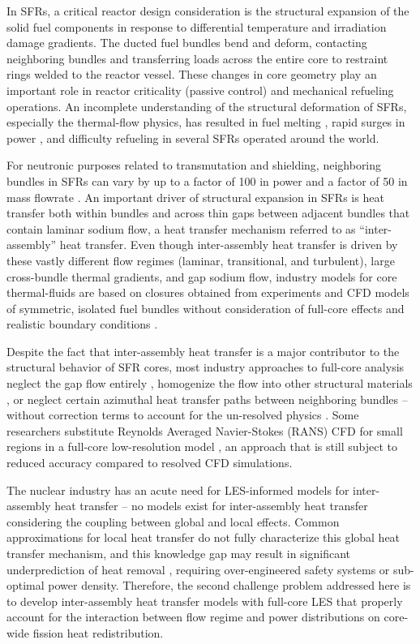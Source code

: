In SFRs, a critical reactor design consideration is the structural expansion of
the solid fuel components in response to differential temperature and
irradiation damage gradients. The ducted fuel bundles bend and deform,
contacting neighboring bundles and transferring loads across the entire core to
restraint rings welded to the reactor vessel. These changes in core geometry
play an important role in reactor criticality (passive control) and mechanical
refueling operations.  An incomplete understanding of the structural
deformation of SFRs, especially the thermal-flow physics, has resulted in fuel
melting \cite{brittan}, rapid surges in power \cite{chaumont}, and difficulty
refueling \cite{shields} in several SFRs operated around the world.

For neutronic purposes related to transmutation and shielding, neighboring
bundles in SFRs can vary by up to a factor of 100 in power and a factor of 50 in mass
flowrate \cite{abr}. An important driver of structural
expansion in SFRs is heat transfer both within bundles and across thin gaps
between adjacent bundles that contain laminar sodium flow, a heat transfer
mechanism referred to as ``inter-assembly'' heat transfer. Even though
inter-assembly heat transfer is driven by these vastly different flow regimes
(laminar, transitional, and turbulent),
large cross-bundle thermal gradients, and gap sodium flow, industry models for
core thermal-fluids are based on closures obtained from experiments and CFD
models of symmetric, isolated fuel bundles without consideration of 
full-core effects and realistic boundary conditions \cite{touran}. 

Despite the fact that inter-assembly heat transfer is a major contributor 
to the structural behavior of SFR cores, most industry approaches to full-core
analysis neglect the
gap flow entirely \cite{touran}, homogenize the flow into other structural
materials \cite{fiorina_of}, or neglect certain azimuthal heat transfer 
paths between neighboring bundles \cite{touran} -- without correction terms to account for the
un-resolved physics \cite{touran,fiorina_of}. Some researchers substitute Reynolds
Averaged Navier-Stokes (RANS) CFD for small regions in a full-core low-resolution
model \cite{wang2020,gerschenfeld,Kim2020}, an approach that is still subject to
 reduced accuracy compared to resolved CFD simulations. 

The nuclear industry has an acute need for LES-informed models for
inter-assembly heat transfer -- no models exist for inter-assembly heat
transfer considering the coupling between global and local effects. Common
approximations for local heat transfer do not fully characterize this
global heat transfer mechanism, and this knowledge gap
may result in significant
underprediction of heat removal \cite{gerschenfeld}, requiring over-engineered
safety systems or sub-optimal power density. Therefore, the second challenge
problem addressed here is to develop inter-assembly heat transfer models with
full-core LES that properly account for the interaction between flow regime and
power distributions on core-wide fission heat redistribution. 

